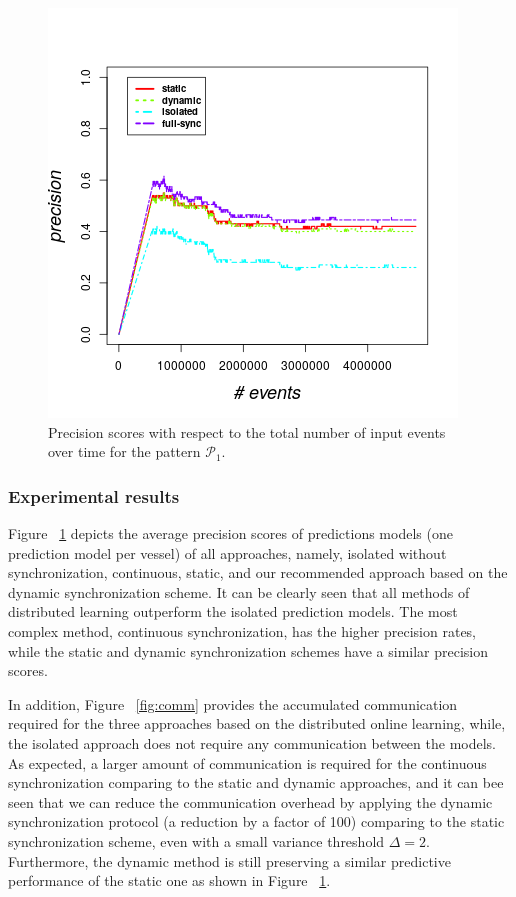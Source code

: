 \begin{figure}[]
	
	\includegraphics[width=.5\textwidth]{figures/precision.png}
	
	\caption{Precision scores with respect to the total number of input events over time for the pattern $\mathcal{P}_1$.}
	\label{fig:precsions}
\end{figure}

\subsubsection*{Experimental results} Figure ~\ref{fig:precsions} depicts the average precision scores of predictions models (one prediction model per vessel) of all approaches, namely, isolated without synchronization, continuous, static, and our recommended approach based on the dynamic synchronization scheme. It can be clearly seen that all methods of distributed learning outperform the isolated prediction models. The most complex method, continuous synchronization, has the higher precision rates, while the static and dynamic synchronization schemes have a similar precision scores. 
\par In addition, Figure ~\ref{fig:comm} provides the accumulated communication required for the three approaches based on the distributed online learning, while, the isolated approach does not require any communication between the models. As expected, a larger amount of communication is required for the continuous synchronization comparing to the static and dynamic approaches, and it can bee seen that we can reduce the communication overhead by applying the dynamic synchronization protocol (a reduction by a factor of 100) comparing to the static synchronization scheme, even with a small variance threshold $\Delta=2$. Furthermore, the dynamic method is still preserving a similar predictive performance of the static one as shown in Figure ~\ref{fig:precsions}.    





